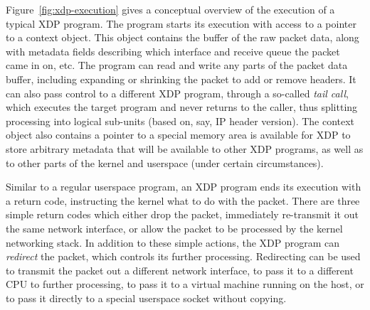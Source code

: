 \documentclass[10pt]{sig-alternate-05-2015}
\begin{document}
Figure~\ref{fig:xdp-execution} gives a conceptual overview of the execution of a
typical XDP program. The program starts its execution with access to a pointer
to a context object. This object contains the buffer of the raw packet data,
along with metadata fields describing which interface and receive queue the
packet came in on, etc. The program can read and write any parts of the packet
data buffer, including expanding or shrinking the packet to add or remove
headers. It can also pass control to a different XDP program, through a
so-called \emph{tail call}, which executes the target program and never returns
to the caller, thus splitting processing into logical sub-units (based on, say,
IP header version). The context object also contains a pointer to a special
memory area is available for XDP to store arbitrary metadata that will be
available to other XDP programs, as well as to other parts of the kernel and
userspace (under certain circumstances).

Similar to a regular userspace program, an XDP program ends its execution with a
return code, instructing the kernel what to do with the packet. There are three
simple return codes which either drop the packet, immediately re-transmit it out
the same network interface, or allow the packet to be processed by the kernel
networking stack. In addition to these simple actions, the XDP program can
\emph{redirect} the packet, which controls its further processing. Redirecting
can be used to transmit the packet out a different network interface, to pass it
to a different CPU to further processing, to pass it to a virtual machine
running on the host, or to pass it directly to a special userspace socket
without copying.
\end{document}
